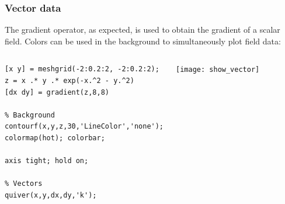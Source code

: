\documentclass[11pt,table,final,fleqn,xcolor={usenames,dvipsnames},unknownkeysallowed,handout]{beamer}
\begin{document}
\begin{frame}[fragile]
  \frametitle{Vector data}
  The gradient operator, as expected, is used to obtain the gradient of a scalar field. Colors can be used in the background to simultaneously plot field data:
  \begin{columns}[T]
    \begin{lstlisting}
[x y] = meshgrid(-2:0.2:2, -2:0.2:2);
z = x .* y .* exp(-x.^2 - y.^2)
[dx dy] = gradient(z,8,8)

% Background
contourf(x,y,z,30,'LineColor','none');
colormap(hot); colorbar;

axis tight; hold on;

% Vectors
quiver(x,y,dx,dy,'k');
    \end{lstlisting}
   \begin{center}
      \texttt{[image: show\_vector]}
    \end{center}
  \end{columns}
\end{frame}

\end{document}

